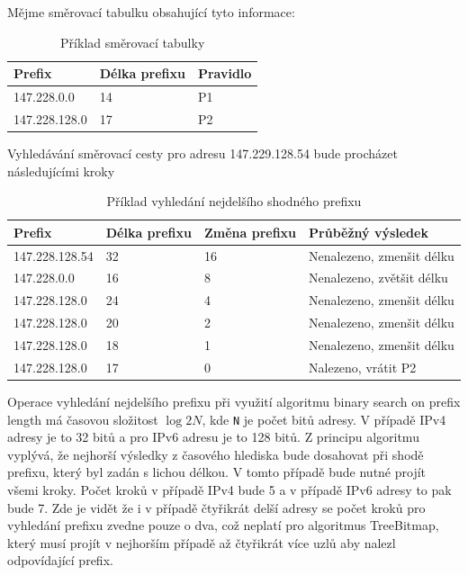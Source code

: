 Mějme směrovací tabulku obsahující tyto informace:

\begin{table}[!htbp]
	\center
    \begin{tabular}{|l|l|l|}
    \hline
    Prefix        & Délka prefixu & Pravidlo \\ \hline
    147.228.0.0   & 14            & P1       \\ \hline
    147.228.128.0 & 17            & P2       \\ \hline
    \end{tabular}
    \caption{Příklad směrovací tabulky}
\end{table}

Vyhledávání směrovací cesty pro adresu 147.229.128.54 bude procházet následujícími kroky

\begin{table}[!htbp]
	\center
    \begin{tabular}{|l|l|l|l|}
    \hline
    Prefix & Délka prefixu  & Změna prefixu & Průběžný výsledek \\ \hline
    147.228.128.54 & 32 & 16 & Nenalezeno, zmenšit délku \\ \hline
    147.228.0.0 & 16 & 8 & Nenalezeno, zvětšit délku \\ \hline
    147.228.128.0 & 24 & 4 & Nenalezeno, zmenšit délku \\ \hline
    147.228.128.0 & 20 & 2 & Nenalezeno, zmenšit délku \\ \hline
    147.228.128.0 & 18 & 1 & Nenalezeno, zmenšit délku \\ \hline
    147.228.128.0 & 17 & 0 & Nalezeno, vrátit P2 \\ \hline
    \end{tabular}
    \caption{Příklad vyhledání nejdelšího shodného prefixu}
\end{table}

Operace vyhledání nejdelšího prefixu při využití algoritmu binary search on prefix length má časovou
složitost $\log{2}{N}$, kde \texttt{N} je počet bitů adresy. V případě IPv4 adresy je to 32 bitů a pro IPv6
adresu je to 128 bitů. Z principu algoritmu vyplývá, že nejhorší výsledky z časového hlediska bude dosahovat
při shodě prefixu, který byl zadán s lichou délkou. V tomto případě bude nutné projít všemi kroky.
Počet kroků v případě IPv4 bude 5 a v případě IPv6 adresy to pak bude 7.
Zde je vidět že i v případě čtyřikrát delší adresy se počet kroků pro vyhledání prefixu zvedne pouze o dva,
což neplatí pro algoritmus TreeBitmap, který musí projít v nejhorším případě až čtyřikrát více
uzlů aby nalezl odpovídající prefix.
\cite{bspl}

